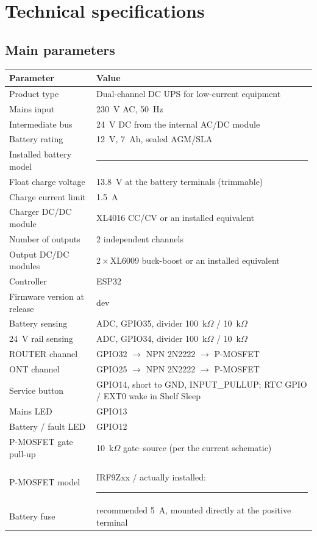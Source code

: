 \documentclass[11pt,a4paper]{article}
\newcommand{\fwversion}{dev}%
\begin{document}
\section{Technical specifications}

\subsection{Main parameters}
\begin{longtable}{@{}p{70mm}p{80mm}@{}}
\toprule
\textbf{Parameter} & \textbf{Value} \\
\midrule
\endhead
Product type & Dual-channel DC UPS for low-current equipment \\
Mains input & 230~V AC, 50~Hz \\
Intermediate bus & 24~V DC from the internal AC/DC module \\
Battery rating & 12~V, 7~Ah, sealed AGM/SLA \\
Installed battery model & \rule{60mm}{0.4pt} \\
Float charge voltage & 13.8~V at the battery terminals (trimmable) \\
Charge current limit & 1.5~A \\
Charger DC/DC module & XL4016 CC/CV or an installed equivalent \\
Number of outputs & 2 independent channels \\
Output DC/DC modules & 2\,$\times$\,XL6009 buck-boost or an installed equivalent \\
Controller & ESP32 \\
Firmware version at release & \fwversion \\
Battery sensing & ADC, GPIO35, divider 100~k$\Omega$ / 10~k$\Omega$ \\
24~V rail sensing & ADC, GPIO34, divider 100~k$\Omega$ / 10~k$\Omega$ \\
ROUTER channel & GPIO32 $\rightarrow$ NPN 2N2222 $\rightarrow$ P-MOSFET \\
ONT channel & GPIO25 $\rightarrow$ NPN 2N2222 $\rightarrow$ P-MOSFET \\
Service button & GPIO14, short to GND, INPUT\_PULLUP; RTC GPIO / EXT0 wake in Shelf Sleep \\
Mains LED & GPIO13 \\
Battery / fault LED & GPIO12 \\
P-MOSFET gate pull-up & 10~k$\Omega$ gate--source (per the current schematic) \\
P-MOSFET model & IRF9Zxx / actually installed: \rule{35mm}{0.4pt} \\
Battery fuse & recommended 5~A, mounted directly at the positive terminal \\
\bottomrule
\end{longtable}
\end{document}
